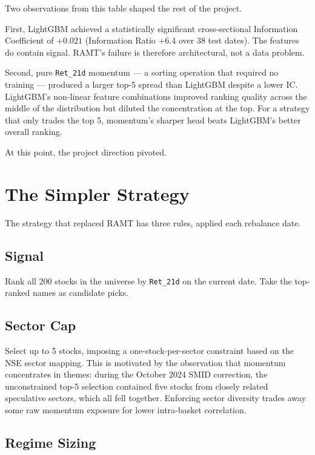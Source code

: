\documentclass[conference]{IEEEtran}
\begin{document}
Two observations from this table shaped the rest of the project.

First, LightGBM achieved a statistically significant cross-sectional Information Coefficient of $+0.021$ (Information Ratio $+6.4$ over 38 test dates). The features do contain signal. RAMT's failure is therefore architectural, not a data problem.

Second, pure \texttt{Ret\_21d} momentum --- a sorting operation that required no training --- produced a larger top-5 spread than LightGBM despite a lower IC. LightGBM's non-linear feature combinations improved ranking quality across the middle of the distribution but diluted the concentration at the top. For a strategy that only trades the top 5, momentum's sharper head beats LightGBM's better overall ranking.

At this point, the project direction pivoted.

\section{The Simpler Strategy}

The strategy that replaced RAMT has three rules, applied each rebalance date.

\subsection{Signal}

Rank all 200 stocks in the universe by \texttt{Ret\_21d} on the current date. Take the top-ranked names as candidate picks.

\subsection{Sector Cap}

Select up to 5 stocks, imposing a one-stock-per-sector constraint based on the NSE sector mapping. This is motivated by the observation that momentum concentrates in themes: during the October 2024 SMID correction, the unconstrained top-5 selection contained five stocks from closely related speculative sectors, which all fell together. Enforcing sector diversity trades away some raw momentum exposure for lower intra-basket correlation.

\subsection{Regime Sizing}
\end{document}
